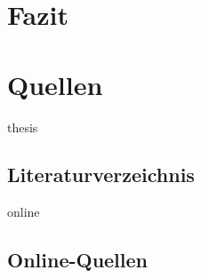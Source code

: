\documentclass[11pt,a4paper]{report}
\begin{document}
\chapter{Fazit}\label{chap:fazit}
\blindtext

\chapter{Quellen}\label{chap:source}



\begin{btSect}{thesis} %
\section*{Literaturverzeichnis}
\btPrintCited
\end{btSect}
\begin{btSect}{online}
\section*{Online-Quellen}
\btPrintCited
%
\end{btSect}
\end{document}
